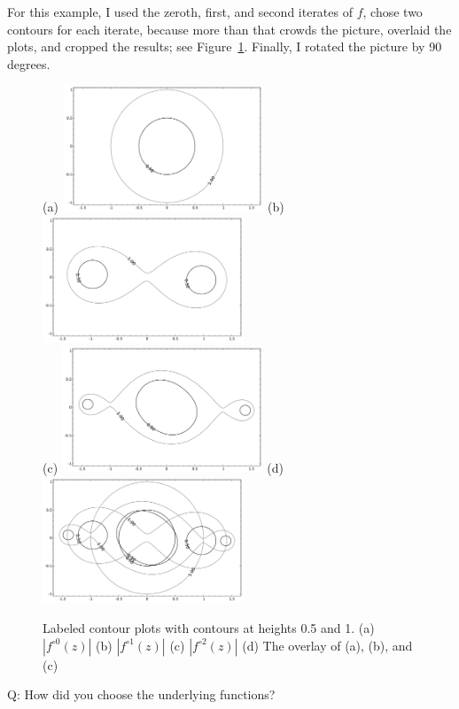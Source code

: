 \documentclass[12pt, a4paper]{amsart}
\begin{document}
For this example, I used the zeroth, first, and second iterates of $f$, chose two contours for each iterate, because more than that crowds the picture, overlaid the plots, and cropped the results; see Figure~\ref{fig:iterates}.
Finally, I rotated the picture by 90 degrees.

\begin{figure}[!htb]
(a) \includegraphics[width=60mm]{images/tutorial_c0.pdf}\qquad
(b) \includegraphics[width=60mm]{images/tutorial_c1.pdf}\\
(c) \includegraphics[width=60mm]{images/tutorial_c2.pdf}\qquad
(d) \includegraphics[width=60mm]{images/tutorial_c012.pdf}
\caption{
Labeled contour plots with contours at heights 0.5 and 1.
(a) $|f^{\circ 0}(z)|$ 
(b) $|f^{\circ 1}(z)|$
(c) $|f^{\circ 2}(z)|$
(d) The overlay of (a), (b), and (c)
}
\label{fig:iterates}
\end{figure}

Q: How did you choose the underlying functions?
\end{document}
